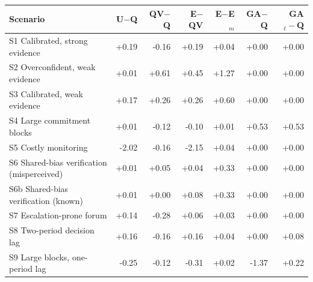 \begin{tabular}{@{}lrrrrrr@{}}
\toprule
Scenario & U$-$Q & QV$-$Q & E$-$QV & E$-$E$_m$ & GA$-$Q & GA$_\ell-$Q \\
\midrule
S1 Calibrated, strong evidence & +0.19 & -0.16 & +0.19 & +0.04 & +0.00 & +0.00 \\
S2 Overconfident, weak evidence & +0.01 & +0.61 & +0.45 & +1.27 & +0.00 & +0.00 \\
S3 Calibrated, weak evidence & +0.17 & +0.26 & +0.26 & +0.60 & +0.00 & +0.00 \\
S4 Large commitment blocks & +0.01 & -0.12 & -0.10 & +0.01 & +0.53 & +0.53 \\
S5 Costly monitoring & -2.02 & -0.16 & -2.15 & +0.04 & +0.00 & +0.00 \\
S6 Shared-bias verification (misperceived) & +0.01 & +0.05 & +0.04 & +0.33 & +0.00 & +0.00 \\
S6b Shared-bias verification (known) & +0.01 & +0.00 & +0.08 & +0.33 & +0.00 & +0.00 \\
S7 Escalation-prone forum & +0.14 & -0.28 & +0.06 & +0.03 & +0.00 & +0.00 \\
S8 Two-period decision lag & +0.16 & -0.16 & +0.16 & +0.04 & +0.00 & +0.08 \\
S9 Large blocks, one-period lag & -0.25 & -0.12 & -0.31 & +0.02 & -1.37 & +0.22 \\
\bottomrule
\end{tabular}